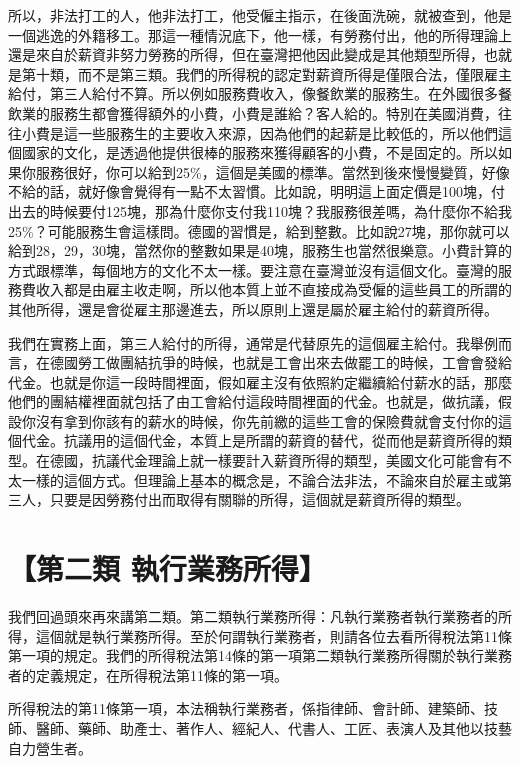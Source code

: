 \documentclass[]{ctexbook}
\begin{document}
所以，非法打工的人，他非法打工，他受僱主指示，在後面洗碗，就被查到，他是一個逃逸的外籍移工。那這一種情況底下，他一樣，有勞務付出，他的所得理論上還是來自於薪資非努力勞務的所得，但在臺灣把他因此變成是其他類型所得，也就是第十類，而不是第三類。我們的所得稅的認定對薪資所得是僅限合法，僅限雇主給付，第三人給付不算。所以例如服務費收入，像餐飲業的服務生。在外國很多餐飲業的服務生都會獲得額外的小費，小費是誰給？客人給的。特別在美國消費，往往小費是這一些服務生的主要收入來源，因為他們的起薪是比較低的，所以他們這個國家的文化，是透過他提供很棒的服務來獲得顧客的小費，不是固定的。所以如果你服務很好，你可以給到25\%，這個是美國的標準。當然到後來慢慢變質，好像不給的話，就好像會覺得有一點不太習慣。比如說，明明這上面定價是100塊，付出去的時候要付125塊，那為什麼你支付我110塊？我服務很差嗎，為什麼你不給我25\%？可能服務生會這樣問。德國的習慣是，給到整數。比如說27塊，那你就可以給到28，29，30塊，當然你的整數如果是40塊，服務生也當然很樂意。小費計算的方式跟標準，每個地方的文化不太一樣。要注意在臺灣並沒有這個文化。臺灣的服務費收入都是由雇主收走啊，所以他本質上並不直接成為受僱的這些員工的所謂的其他所得，還是會從雇主那邊進去，所以原則上還是屬於雇主給付的薪資所得。

我們在實務上面，第三人給付的所得，通常是代替原先的這個雇主給付。我舉例而言，在德國勞工做團結抗爭的時候，也就是工會出來去做罷工的時候，工會會發給代金。也就是你這一段時間裡面，假如雇主沒有依照約定繼續給付薪水的話，那麼他們的團結權裡面就包括了由工會給付這段時間裡面的代金。也就是，做抗議，假設你沒有拿到你該有的薪水的時候，你先前繳的這些工會的保險費就會支付你的這個代金。抗議用的這個代金，本質上是所謂的薪資的替代，從而他是薪資所得的類型。在德國，抗議代金理論上就一樣要計入薪資所得的類型，美國文化可能會有不太一樣的這個方式。但理論上基本的概念是，不論合法非法，不論來自於雇主或第三人，只要是因勞務付出而取得有關聯的所得，這個就是薪資所得的類型。

\hypertarget{ux7b2cux4e8cux985e-ux57f7ux884cux696dux52d9ux6240ux5f97}{%
\section{【第二類 執行業務所得】}\label{ux7b2cux4e8cux985e-ux57f7ux884cux696dux52d9ux6240ux5f97}}

我們回過頭來再來講第二類。第二類執行業務所得：凡執行業務者執行業務者的所得，這個就是執行業務所得。至於何謂執行業務者，則請各位去看所得稅法第11條第一項的規定。我們的所得稅法第14條的第一項第二類執行業務所得關於執行業務者的定義規定，在所得稅法第11條的第一項。

所得稅法的第11條第一項，本法稱執行業務者，係指律師、會計師、建築師、技師、醫師、藥師、助產士、著作人、經紀人、代書人、工匠、表演人及其他以技藝自力營生者。
\end{document}
